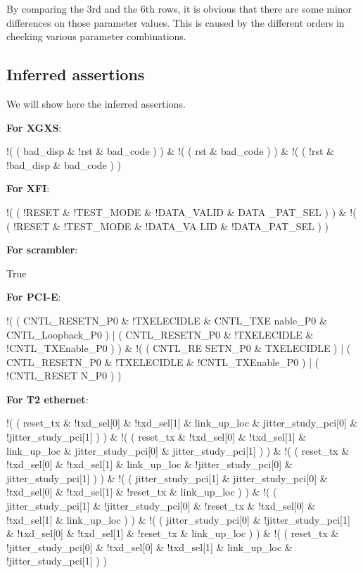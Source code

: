 \documentclass{sig-alternate}
\begin{document}
By comparing the 3rd and the 6th rows,
it is obvious that there are some minor differences on those parameter values.
This is caused by the different orders in checking various parameter combinations.

\subsection{Inferred assertions}
We will show here the inferred assertions.

\textbf{For XGXS}:

!( ( bad\_disp \& !rst \& bad\_code ) ) \& !( ( rst \& bad\_code ) ) \& !( ( !rst \& !bad\_disp \& bad\_code ) )

\textbf{For XFI}:

!( ( !RESET \& !TEST\_MODE \& !DATA\_VALID \& DATA \_PAT\_SEL ) ) \& !( ( !RESET \& !TEST\_MODE \& !DATA\_VA LID \& !DATA\_PAT\_SEL ) )

\textbf{For scrambler}:

True

\textbf{For PCI-E}:

!( ( CNTL\_RESETN\_P0 \& !TXELECIDLE \& CNTL\_TXE nable\_P0 \& CNTL\_Loopback\_P0 ) | ( CNTL\_RESETN\_P0 \& !TXELECIDLE \& !CNTL\_TXEnable\_P0 ) ) \& !( ( CNTL\_RE SETN\_P0 \& TXELECIDLE ) | ( CNTL\_RESETN\_P0 \& !TXELECIDLE \& !CNTL\_TXEnable\_P0 ) | ( !CNTL\_RESET N\_P0 ) )

\textbf{For T2 ethernet}:

!( ( reset\_tx \& !txd\_sel[0] \& !txd\_sel[1] \& link\_up\_loc \& jitter\_study\_pci[0] \& !jitter\_study\_pci[1] ) ) \& !( ( reset\_tx \& !txd\_sel[0] \& !txd\_sel[1] \& link\_up\_loc \& jitter\_study\_pci[0] \& jitter\_study\_pci[1] ) ) \& !( ( reset\_tx \& !txd\_sel[0] \& !txd\_sel[1] \& link\_up\_loc \& !jitter\_study\_pci[0] \& jitter\_study\_pci[1] ) ) \& !( ( jitter\_study\_pci[1] \& jitter\_study\_pci[0] \& !txd\_sel[0] \& !txd\_sel[1] \& !reset\_tx \& link\_up\_loc ) ) \& !( ( jitter\_study\_pci[1] \& !jitter\_study\_pci[0] \& !reset\_tx \& !txd\_sel[0] \& !txd\_sel[1] \& link\_up\_loc ) ) \& !( ( jitter\_study\_pci[0] \& !jitter\_study\_pci[1] \& !txd\_sel[0] \& !txd\_sel[1] \& !reset\_tx \& link\_up\_loc ) ) \& !( ( reset\_tx \& !jitter\_study\_pci[0] \& !txd\_sel[0] \& !txd\_sel[1] \& link\_up\_loc \& !jitter\_study\_pci[1] ) )

\end{document}
